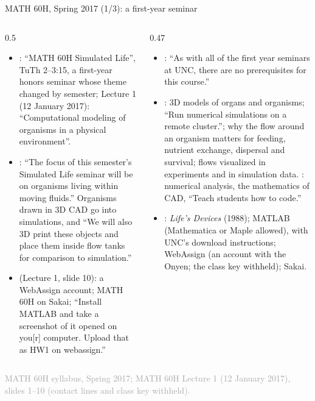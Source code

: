 \documentclass[aspectratio=169,11pt]{beamer}
\newcommand{\sourcecredit}[1]{\vfill\begin{flushright}\tiny\textcolor{DarkGray}{#1}\end{flushright}}
\begin{document}
\begin{frame}{MATH 60H, Spring 2017 (1/3): a first-year seminar}
\label{fr:m60a}
\begin{columns}[T,onlytextwidth]
\begin{column}{0.5\textwidth}
\footnotesize
\begin{itemize}\setlength{\itemsep}{3pt}
  \item {}: ``MATH 60H Simulated Life'', TuTh 2--3:15, a first-year honors seminar whose theme changed by semester; Lecture 1 (12 January 2017): ``Computational modeling of organisms in a physical environment''.
  \item {}: ``The focus of this semester's Simulated Life seminar will be on organisms living within moving fluids.'' Organisms drawn in 3D CAD go into simulations, and ``We will also 3D print these objects and place them inside flow tanks for comparison to simulation.''
  \item {} (Lecture 1, slide 10): a WebAssign account; MATH 60H on Sakai; ``Install MATLAB and take a screenshot of it opened on you[r] computer. Upload that as HW1 on webassign.''
\end{itemize}
\end{column}
\begin{column}{0.47\textwidth}
\footnotesize
\begin{itemize}\setlength{\itemsep}{3pt}
  \item {}: ``As with all of the first year seminars at UNC, there are no prerequisites for this course.''
  \item {}: 3D models of organs and organisms; ``Run numerical simulations on a remote cluster.''; why the flow around an organism matters for feeding, nutrient exchange, dispersal and survival; flows visualized in experiments and in simulation data. : numerical analysis, the mathematics of CAD, ``Teach students how to code.''
  \item {}: \emph{Life's Devices} (1988); MATLAB (Mathematica or Maple allowed), with UNC's download instructions; WebAssign (an account with the Onyen; the class key withheld); Sakai.
\end{itemize}
\end{column}
\end{columns}
\sourcecredit{MATH 60H syllabus, Spring 2017; MATH 60H Lecture 1 (12 January 2017), slides 1--10 (contact lines and class key withheld).}
\end{frame}
\end{document}
